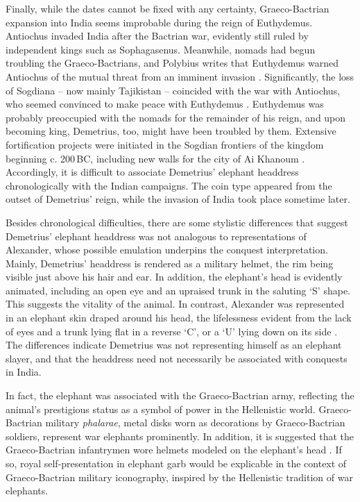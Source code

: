 \documentclass{ijsra}
\renewcommand\BC{{\,BC\xspace}}
\begin{document}
Finally, while the dates cannot be fixed with any certainty, Graeco-Bactrian expansion into India seems improbable during the reign of Euthydemus.
Antiochus invaded India after the Bactrian war, evidently still ruled by independent kings such as Sophagasenus.
Meanwhile, nomads had begun troubling the Graeco-Bactrians, and Polybius writes that Euthydemus warned Antiochus of the mutual threat from an imminent invasion \parencite[]{Pol. Hist.11.34}.
Significantly, the loss of Sogdiana – now mainly Tajikistan – coincided with the war with Antiochus, who seemed convinced to make peace with Euthydemus \parencites[38--39]{Holt1981}[135]{Holt1999}.
Euthydemus was probably preoccupied with the nomads for the remainder of his reign, and upon becoming king, Demetrius, too, might have been troubled by them.
Extensive fortification projects were initiated in the Sogdian frontiers of the kingdom beginning c. 200\BC, including new walls for the city of Ai Khanoum \parencites[38--39]{Holt1981}[135]{Holt1999}[60--61]{Lerner1999}[236]{Widemann2000}.
Accordingly, it is difficult to associate Demetrius’ elephant headdress chronologically with the Indian campaigns.
The coin type appeared from the outset of Demetrius’ reign, while the invasion of India took place sometime later.

Besides chronological difficulties, there are some stylistic differences that suggest Demetrius’ elephant headdress was not analogous to representations of Alexander, whose possible emulation underpins the conquest interpretation.
Mainly, Demetrius’ headdress is rendered as a military helmet, the rim being visible just above his hair and ear.
In addition, the elephant’s head is evidently animated, including an open eye and an upraised trunk in the saluting ‘S’ shape.
This suggests the vitality of the animal.
In contrast, Alexander was represented in an elephant skin draped around his head,
the lifelessness evident from the lack of eyes and a trunk lying flat in
a reverse ‘C’, or a ‘U’ lying down on its side \parencites[11]{Dahmen2007}[37]{Marcinkiewicz-Joseph2016}[48]{Maritz2004}[63]{Smith1986}.
The differences indicate Demetrius was not representing himself as an elephant slayer, and that the headdress need not necessarily be associated with conquests in India. 

In fact, the elephant was associated with the Graeco-Bactrian army, reflecting the animal’s prestigious status as a symbol of power in the Hellenistic world.
Graeco-Bactrian military \emph{phalarae}, metal disks worn as decorations by Graeco-Bactrian soldiers, represent war elephants prominently.
In addition, it is suggested that the Graeco-Bactrian infantrymen wore helmets modeled on the elephant’s head \parencites[170]{Abduallaev1995}[1206-1211]{Bannikov2013}[9--10]{Pfrommer1993}[588]{Treister1999}.
If so, royal self-presentation in elephant garb would be explicable in the context of Graeco-Bactrian military iconography, inspired by the Hellenistic tradition of war elephants.
\end{document}

